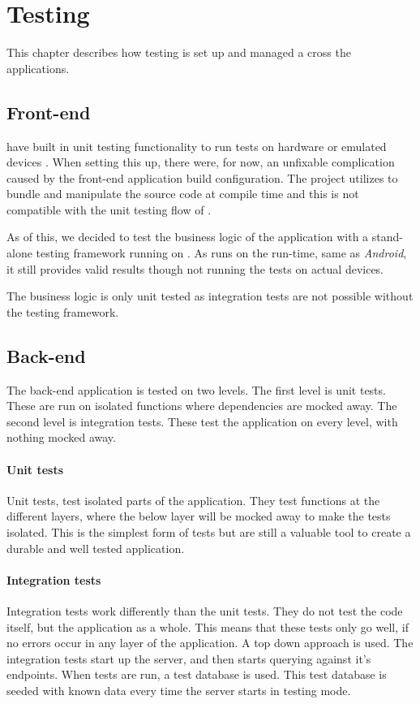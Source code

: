 \chapter{Testing}
This chapter describes how testing is set up and managed a cross the applications.

\section{Front-end}
 have built in unit testing functionality to run tests on hardware or emulated devices \citep{testing:nativescript}.
When setting this up, there were, for now, an unfixable complication caused by the front-end application build configuration.
The project utilizes  to bundle and manipulate the source code at compile time and this is not compatible with the  unit testing flow of .

As of this, we decided to test the business logic of the application with a stand-alone testing framework running on .
As  runs on the  run-time, same as \textit{Android}, it still provides valid results though not running the tests on actual devices.

The business logic is only unit tested as integration tests are not possible without the  testing framework.

\section{Back-end}
The back-end application is tested on two levels.
The first level is unit tests.
These are run on isolated functions where dependencies are mocked away.
The second level is integration tests.
These test the application on every level, with nothing mocked away. 

\subsubsection{Unit tests}
Unit tests, test isolated parts of the application. 
They test functions at the different layers, where the below layer will be mocked away to make the tests isolated.
This is the simplest form of tests but are still a valuable tool to create a durable and well tested application.

\subsubsection{Integration tests}
Integration tests work differently than the unit tests. 
They do not test the code itself, but the application as a whole. 
This means that these tests only go well, if no errors occur in any layer of the application. 
A top down approach is used.
The integration tests start up the  server, and then starts querying against it's endpoints. 
When tests are run, a test database is used. This test database is seeded with known data every time the server starts in testing mode.

